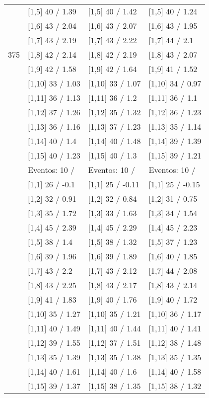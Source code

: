 \begin{table}
\begin{tabular}[t]{llll}
 & {}[1,5] 40  / 1.39 & {}[1,5] 40  / 1.42 & {}[1,5] 40  / 1.24\\
 & {}[1,6] 43  / 2.04 & {}[1,6] 43  / 2.07 & {}[1,6] 43  / 1.95\\
 & {}[1,7] 43  / 2.19 & {}[1,7] 43  / 2.22 & {}[1,7] 44  / 2.1\\
375 & {}[1,8] 42  / 2.14 & {}[1,8] 42  / 2.19 & {}[1,8] 43  / 2.07\\
\addlinespace
 & {}[1,9] 42  / 1.58 & {}[1,9] 42  / 1.64 & {}[1,9] 41  / 1.52\\
 & {}[1,10] 33  / 1.03 & {}[1,10] 33  / 1.07 & {}[1,10] 34  / 0.97\\
 & {}[1,11] 36  / 1.13 & {}[1,11] 36  / 1.2 & {}[1,11] 36  / 1.1\\
 & {}[1,12] 37  / 1.26 & {}[1,12] 35  / 1.32 & {}[1,12] 36  / 1.23\\
 & {}[1,13] 36  / 1.16 & {}[1,13] 37  / 1.23 & {}[1,13] 35  / 1.14\\
\addlinespace
 & {}[1,14] 40  / 1.4 & {}[1,14] 40  / 1.48 & {}[1,14] 39  / 1.39\\
 & {}[1,15] 40  / 1.23 & {}[1,15] 40  / 1.3 & {}[1,15] 39  / 1.21\\
 & Eventos:  10 / & Eventos:  10 / & Eventos:  10 /\\
 & {}[1,1] 26  / -0.1 & {}[1,1] 25  / -0.11 & {}[1,1] 25  / -0.15\\
 & {}[1,2] 32  / 0.91 & {}[1,2] 32  / 0.84 & {}[1,2] 31  / 0.75\\
\addlinespace
 & {}[1,3] 35  / 1.72 & {}[1,3] 33  / 1.63 & {}[1,3] 34  / 1.54\\
 & {}[1,4] 45  / 2.39 & {}[1,4] 45  / 2.29 & {}[1,4] 45  / 2.23\\
 & {}[1,5] 38  / 1.4 & {}[1,5] 38  / 1.32 & {}[1,5] 37  / 1.23\\
 & {}[1,6] 39  / 1.96 & {}[1,6] 39  / 1.89 & {}[1,6] 40  / 1.85\\
 & {}[1,7] 43  / 2.2 & {}[1,7] 43  / 2.12 & {}[1,7] 44  / 2.08\\
\addlinespace
500 & {}[1,8] 43  / 2.25 & {}[1,8] 43  / 2.17 & {}[1,8] 43  / 2.14\\
 & {}[1,9] 41  / 1.83 & {}[1,9] 40  / 1.76 & {}[1,9] 40  / 1.72\\
 & {}[1,10] 35  / 1.27 & {}[1,10] 35  / 1.21 & {}[1,10] 36  / 1.17\\
 & {}[1,11] 40  / 1.49 & {}[1,11] 40  / 1.44 & {}[1,11] 40  / 1.41\\
 & {}[1,12] 39  / 1.55 & {}[1,12] 37  / 1.51 & {}[1,12] 38  / 1.48\\
\addlinespace
 & {}[1,13] 35  / 1.39 & {}[1,13] 35  / 1.38 & {}[1,13] 35  / 1.35\\
 & {}[1,14] 40  / 1.61 & {}[1,14] 40  / 1.6 & {}[1,14] 40  / 1.58\\
 & {}[1,15] 39  / 1.37 & {}[1,15] 38  / 1.35 & {}[1,15] 38  / 1.32\\
\bottomrule
\end{tabular}
\end{table}
